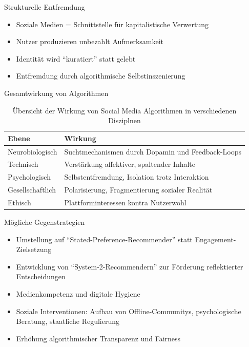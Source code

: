 \begin{frame}{Strukturelle Entfremdung~\cite{rey_alienation_2012}}
    \begin{itemize}
        \item Soziale Medien = Schnittstelle für kapitalistische Verwertung
        \item Nutzer produzieren unbezahlt Aufmerksamkeit
        \item Identität wird \enquote{kuratiert} statt gelebt
        \item Entfremdung durch algorithmische Selbstinszenierung
    \end{itemize}
\end{frame}
\begin{frame}{Gesamtwirkung von Algorithmen}
    \begin{table}
        \begin{tabular}{@{}p{3.5cm}p{6.5cm}@{}}
            \toprule
            \textbf{Ebene} & \textbf{Wirkung} \\
            \midrule
            Neurobiologisch & Suchtmechanismen durch Dopamin und Feedback-Loops \\
            Technisch & Verstärkung affektiver, spaltender Inhalte \\
            Psychologisch & Selbstentfremdung, Isolation trotz Interaktion \\
            Gesellschaftlich & Polarisierung, Fragmentierung sozialer Realität \\
            Ethisch & Plattforminteressen kontra Nutzerwohl \\
            \bottomrule
        \end{tabular}
        \caption{Übersicht der Wirkung von Social Media Algorithmen in verschiedenen Disziplnen}
        \label{tab:fazit}
    \end{table}
\end{frame}

\begin{frame}{Mögliche Gegenstrategien}
    \begin{itemize}
        \item Umstellung auf \enquote{Stated-Preference-Recommender} statt Engagement-Zielsetzung~\cite{milli_engagement_2024}
        \item Entwicklung von \enquote{System-2-Recommendern} zur Förderung reflektierter Entscheidungen~\cite{milli_engagement_2024}
        \item Medienkompetenz und digitale Hygiene~\cite{santini_social_2024}
        \item Soziale Interventionen: Aufbau von Offline-Communitys, psychologische Beratung, staatliche Regulierung~\cite{siddiq_social_2024}
        \item Erhöhung algorithmischer Transparenz und Fairness
    \end{itemize}
\end{frame}
